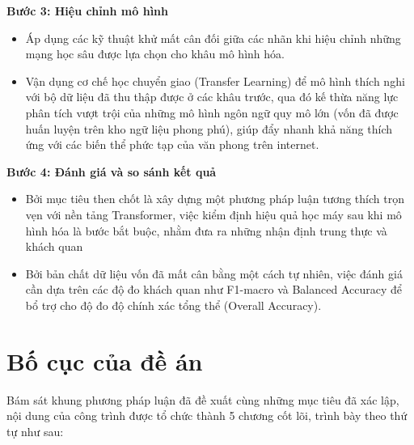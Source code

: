 \textbf{Bước 3: Hiệu chỉnh mô hình}
\begin{itemize}[label=-]
    \item Áp dụng các kỹ thuật khử mất cân đối giữa các nhãn khi hiệu chỉnh những mạng học sâu được lựa chọn cho khâu mô hình hóa.
    \item Vận dụng cơ chế học chuyển giao (Transfer Learning) để mô hình thích nghi với bộ dữ liệu đã thu thập được ở các khâu trước, qua đó kế thừa năng lực phân tích vượt trội của những mô hình ngôn ngữ quy mô lớn (vốn đã được huấn luyện trên kho ngữ liệu phong phú), giúp đẩy nhanh khả năng thích ứng với các biến thể phức tạp của văn phong trên internet.
\end{itemize}

\textbf{Bước 4: Đánh giá và so sánh kết quả}
\begin{itemize}[label=-]
    \item Bởi mục tiêu then chốt là xây dựng một phương pháp luận tương thích trọn vẹn với nền tảng Transformer, việc kiểm định hiệu quả học máy sau khi mô hình hóa là bước bắt buộc, nhằm đưa ra những nhận định trung thực và khách quan
    \item Bởi bản chất dữ liệu vốn đã mất cân bằng một cách tự nhiên, việc đánh giá cần dựa trên các độ đo khách quan như F1-macro và Balanced Accuracy để bổ trợ cho độ đo độ chính xác tổng thể (Overall Accuracy).
\end{itemize}

\section{Bố cục của đề án}

Bám sát khung phương pháp luận đã đề xuất cùng những mục tiêu đã xác lập, nội dung của công trình được tổ chức thành 5 chương cốt lõi, trình bày theo thứ tự như sau:

